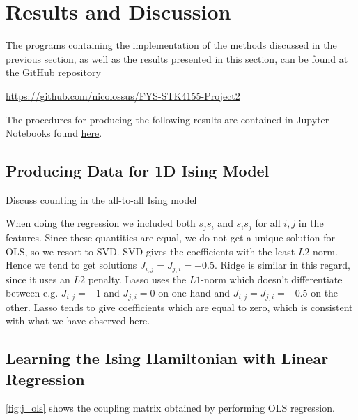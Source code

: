 \section{Results and Discussion}\label{sec:Results}

The programs containing the implementation of the methods discussed in the previous section, as well as the results presented in this section, can be found at the GitHub repository
\begin{center}
    \url{https://github.com/nicolossus/FYS-STK4155-Project2}
\end{center}

The procedures for producing the following results are contained in Jupyter Notebooks found \href{https://github.com/nicolossus/FYS-STK4155-Project2/tree/master/notebooks}{here}.


\subsection{Producing Data for 1D Ising Model}\label{sec:results datagen}

Discuss counting in the all-to-all Ising model

When doing the regression we included both $s_js_i$ and $s_is_j$ for all $i,j$ in the features. Since these quantities are equal, we do not get a unique solution for OLS, so we resort to SVD. SVD gives the coefficients with the least $L2$-norm. Hence we tend to get solutions $J_{i,j}=J_{j,i}=-0.5$. Ridge is similar in this regard, since it uses an $L2$ penalty. Lasso uses the $L1$-norm which doesn't differentiate between e.g. $J_{i,j}=-1$ and $J_{j,i} = 0$ on one hand and $J_{i,j}=J_{j,i}=-0.5$ on the other. Lasso tends to give coefficients which are equal to zero, which is consistent with what we have observed here.

\subsection{Learning the Ising Hamiltonian with Linear Regression}\label{sec:results linreg}

\autoref{fig:j_ols} shows the coupling matrix obtained by performing OLS regression.

